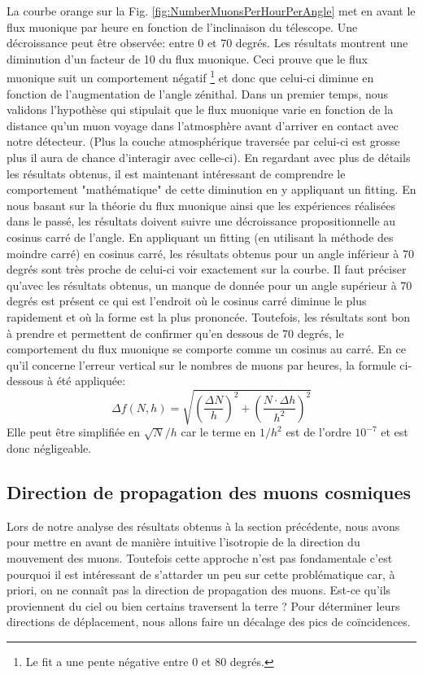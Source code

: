 \documentclass[12pt]{article}
\begin{document}
La courbe orange sur la Fig. \ref{fig:NumberMuonsPerHourPerAngle} met en avant le flux muonique par heure en fonction de l'inclinaison du télescope.
 Une décroissance peut être observée: entre 0 et 70 degrés. Les résultats montrent une diminution d'un facteur de 10 du flux muonique. Ceci prouve que le flux muonique suit un comportement négatif \footnote{Le fit a une pente négative entre 0 et 80 degrés.} et donc que celui-ci diminue en fonction de l'augmentation de l'angle zénithal. Dans un premier temps, nous validons l'hypothèse qui stipulait que le flux muonique varie en fonction de la distance qu'un muon voyage dans l'atmosphère avant d'arriver en contact avec notre détecteur. (Plus la couche atmosphérique traversée par celui-ci est grosse plus il aura de chance d'interagir avec celle-ci). En regardant avec plus de détails les résultats obtenus, il est maintenant intéressant de comprendre le comportement "mathématique" de cette diminution en y appliquant un fitting.  En nous basant sur la théorie du flux muonique ainsi que les expériences réalisées dans le passé, les résultats doivent suivre une décroissance propositionnelle au cosinus carré de l'angle. En appliquant un fitting (en utilisant la méthode des moindre carré) en cosinus carré, les résultats obtenus pour un angle inférieur à 70 degrés sont très proche de celui-ci voir exactement sur la courbe. Il faut préciser qu'avec les résultats obtenus, un manque de donnée pour un angle supérieur à 70 degrés est présent ce qui est l'endroit où le cosinus carré diminue le plus rapidement et où la forme est la plus prononcée. Toutefois,  les résultats sont bon à prendre et permettent de confirmer qu'en dessous de 70 degrés, le comportement du flux muonique se comporte comme un cosinus au carré. En ce qu'il concerne l'erreur vertical sur le nombres de muons par heures, la formule ci-dessous à été appliquée:
\[
    \Delta f(N,h)=\sqrt{\left(\frac{\Delta N}{h}\right)^2+\left(\frac{N\cdot\Delta h }{h^2}\right)^2}
\]
Elle peut être simplifiée en $\sqrt{N}/h$ car le terme en $1/h^2$ est de l'ordre $10^{-7}$ et est donc négligeable.


\subsection{Direction de propagation des muons cosmiques}
Lors de notre analyse des résultats obtenus à la section précédente, nous avons pour mettre en avant de manière intuitive l'isotropie de la direction du mouvement des muons. Toutefois cette approche n'est pas fondamentale c'est pourquoi il est intéressant de s'attarder un peu sur cette problématique car, à priori, on ne connaît pas la direction de propagation des muons. Est-ce qu'ils proviennent du ciel ou bien certains traversent la terre ? Pour déterminer leurs directions de déplacement, nous allons faire un décalage des pics de coïncidences.
\end{document}
